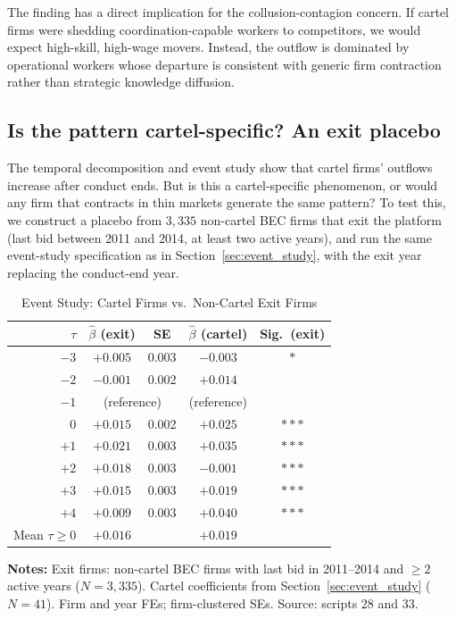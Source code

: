 The finding has a direct implication for the collusion-contagion concern. If cartel firms were shedding coordination-capable workers to competitors, we would expect high-skill, high-wage movers. Instead, the outflow is dominated by operational workers whose departure is consistent with generic firm contraction rather than strategic knowledge diffusion.

\subsection{Is the pattern cartel-specific? An exit placebo}\label{sec:exit_placebo}

The temporal decomposition and event study show that cartel firms' outflows increase after conduct ends. But is this a cartel-specific phenomenon, or would any firm that contracts in thin markets generate the same pattern? To test this, we construct a placebo from $3{,}335$ non-cartel BEC firms that exit the platform (last bid between 2011 and 2014, at least two active years), and run the same event-study specification as in Section~\ref{sec:event_study}, with the exit year replacing the conduct-end year.

\begin{table}[htbp]
\centering
\caption{Event Study: Cartel Firms vs.\ Non-Cartel Exit Firms}\label{tab:exit_placebo}
\begin{tabular}{rcccc}
\toprule
$\tau$ & $\hat{\beta}$ (exit) & SE & $\hat{\beta}$ (cartel) & Sig.\ (exit) \\
\midrule
$-3$ & $+0.005$ & 0.003 & $-0.003$ & $*$ \\
$-2$ & $-0.001$ & 0.002 & $+0.014$ & \\
$-1$ & \multicolumn{2}{c}{(reference)} & (reference) & \\
$0$ & $+0.015$ & 0.002 & $+0.025$ & $***$ \\
$+1$ & $+0.021$ & 0.003 & $+0.035$ & $***$ \\
$+2$ & $+0.018$ & 0.003 & $-0.001$ & $***$ \\
$+3$ & $+0.015$ & 0.003 & $+0.019$ & $***$ \\
$+4$ & $+0.009$ & 0.003 & $+0.040$ & $***$ \\
\midrule
Mean $\tau \ge 0$ & $+0.016$ & & $+0.019$ & \\
\bottomrule
\end{tabular}
\vspace{0.5em}
\begin{minipage}{0.90\textwidth}
\scriptsize{\textbf{Notes:} Exit firms: non-cartel BEC firms with last bid in 2011--2014 and $\ge 2$ active years ($N = 3{,}335$). Cartel coefficients from Section~\ref{sec:event_study} ($N = 41$). Firm and year FEs; firm-clustered SEs. Source: scripts 28 and 33.\par}
\end{minipage}
\end{table}

